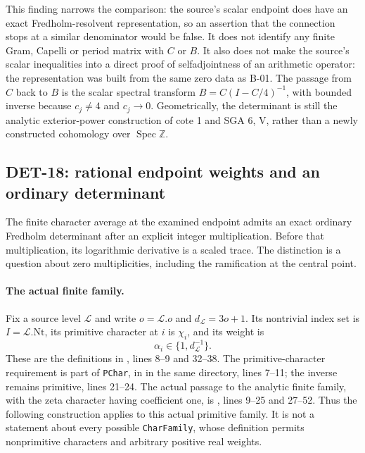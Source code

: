 \documentclass[11pt,a4paper]{article}
\newcommand{\Z}{\mathbb Z}
\newcommand{\fid}[1]{\textsf{#1}}
\begin{document}
This finding narrows the comparison: the source's scalar endpoint does have an exact Fredholm-resolvent representation, so an assertion that the connection stops at a similar denominator would be false. It does not identify any finite Gram, Capelli or period matrix with $C$ or $B$. It also does not make the source's scalar inequalities into a direct proof of selfadjointness of an arithmetic operator: the representation was built from the same zero data as \fid{B-01}. The passage from $C$ back to $B$ is the scalar spectral transform $B=C(I-C/4)^{-1}$, with bounded inverse because $c_j\ne4$ and $c_j\to0$. Geometrically, the determinant is still the analytic exterior-power construction of cote 1 and SGA 6, V, rather than a newly constructed cohomology over $\operatorname{Spec}\Z$.

\subsection{DET-18: rational endpoint weights and an ordinary determinant}
The finite character average at the examined endpoint admits an exact
ordinary Fredholm determinant after an explicit integer multiplication.
Before that multiplication, its logarithmic derivative is a scaled trace.
The distinction is a question about zero multiplicities, including the
ramification at the central point.

\paragraph{The actual finite family.}
Fix a source level $\mathcal L$ and write $o=\mathcal L.o$ and
$d_{\mathcal L}=3o+1$. Its nontrivial index set is
$I=\mathcal L.\mathrm{Nt}$, its primitive character at $i$ is $\chi_i$,
and its weight is
\[
 \alpha_i\in\{1,d_{\mathcal L}^{-1}\}.
\]
These are the definitions in
,
lines 8--9 and 32--38.
The primitive-character requirement is part of \texttt{PChar}, in
 in the same directory, lines 7--11;
the inverse remains primitive, lines 21--24.
The actual passage to the analytic finite family, with the zeta character
having coefficient one, is
,
lines 9--25 and 27--52.
Thus the following construction applies to this actual primitive family.
It is not a statement about every possible \texttt{CharFamily}, whose
definition permits nonprimitive characters and arbitrary positive real
weights.
\end{document}
